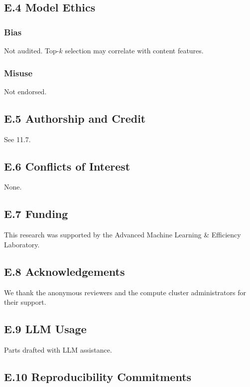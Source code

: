 \subsection{E.4 Model Ethics}

\subsubsection{Bias}
Not audited. Top-$k$ selection may correlate with content features.

\subsubsection{Misuse}
Not endorsed.

\subsection{E.5 Authorship and Credit}

See  11.7.

\subsection{E.6 Conflicts of Interest}

None.

\subsection{E.7 Funding}

This research was supported by the Advanced Machine Learning \& Efficiency Laboratory.

\subsection{E.8 Acknowledgements}

We thank the anonymous reviewers and the compute cluster administrators for their support.

\subsection{E.9 LLM Usage}

Parts drafted with LLM assistance.

\subsection{E.10 Reproducibility Commitments}

